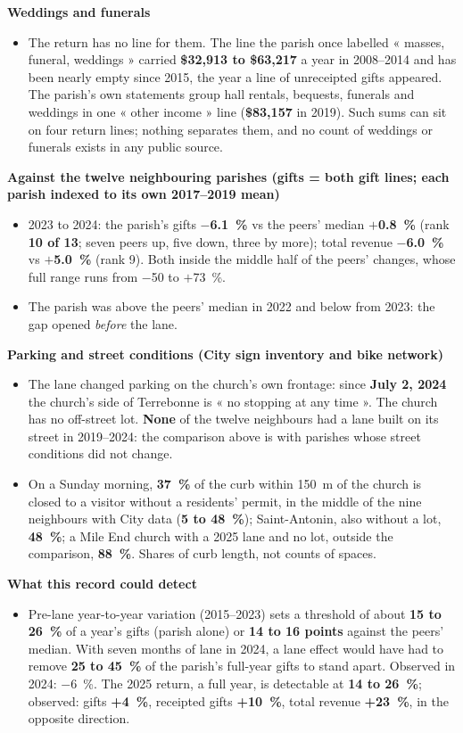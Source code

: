 \documentclass[10pt,letterpaper]{article}
\newcommand{\B}[1]{\textbf{#1}}
\begin{document}
\textbf{Weddings and funerals}
\begin{itemize}[nosep,leftmargin=1.2em]
\item The return has no line for them. The line the parish once labelled « masses, funeral, weddings » carried \B{\$32,913 to \$63,217} a year in 2008--2014 and has been nearly empty since 2015, the year a line of unreceipted gifts appeared. The parish's own statements group hall rentals, bequests, funerals and weddings in one « other income » line (\B{\$83,157} in 2019). Such sums can sit on four return lines; nothing separates them, and no count of weddings or funerals exists in any public source.
\end{itemize}

\textbf{Against the twelve neighbouring parishes (gifts = both gift lines; each parish indexed to its own 2017--2019 mean)}
\begin{itemize}[nosep,leftmargin=1.2em]
\item 2023 to 2024: the parish's gifts \B{$-$6.1~\%} vs the peers' median \B{$+$0.8~\%} (rank \B{10 of 13}; seven peers up, five down, three by more); total revenue \B{$-$6.0~\%} vs \B{$+$5.0~\%} (rank 9). Both inside the middle half of the peers' changes, whose full range runs from $-$50 to $+$73~\%.
\item The parish was above the peers' median in 2022 and below from 2023: the gap opened \emph{before} the lane.
\end{itemize}

\textbf{Parking and street conditions (City sign inventory and bike network)}
\begin{itemize}[nosep,leftmargin=1.2em]
\item The lane changed parking on the church's own frontage: since \B{July 2, 2024} the church's side of Terrebonne is « no stopping at any time ». The church has no off-street lot. \B{None} of the twelve neighbours had a lane built on its street in 2019--2024: the comparison above is with parishes whose street conditions did not change.
\item On a Sunday morning, \B{37~\%} of the curb within 150~m of the church is closed to a visitor without a residents' permit, in the middle of the nine neighbours with City data (\B{5 to 48~\%}); Saint-Antonin, also without a lot, \B{48~\%}; a Mile End church with a 2025 lane and no lot, outside the comparison, \B{88~\%}. Shares of curb length, not counts of spaces.
\end{itemize}

\textbf{What this record could detect}
\begin{itemize}[nosep,leftmargin=1.2em]
\item Pre-lane year-to-year variation (2015--2023) sets a threshold of about \B{15 to 26~\%} of a year's gifts (parish alone) or \B{14 to 16 points} against the peers' median. With seven months of lane in 2024, a lane effect would have had to remove \B{25 to 45~\%} of the parish's full-year gifts to stand apart. Observed in 2024: $-$6~\%. The 2025 return, a full year, is detectable at \B{14 to 26~\%}; observed: gifts \B{+4~\%}, receipted gifts \B{+10~\%}, total revenue \B{+23~\%}, in the opposite direction.
\end{itemize}
\end{document}
